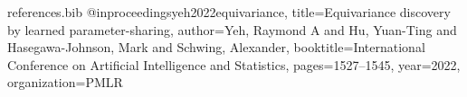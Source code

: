 \begin{filecontents*}[overwrite]{references.bib}
@inproceedings{yeh2022equivariance,
  title={Equivariance discovery by learned parameter-sharing},
  author={Yeh, Raymond A and Hu, Yuan-Ting and Hasegawa-Johnson, Mark and Schwing, Alexander},
  booktitle={International Conference on Artificial Intelligence and Statistics},
  pages={1527--1545},
  year={2022},
  organization={PMLR}
}
\end{filecontents*}

\nocite{yeh2022equivariance}


